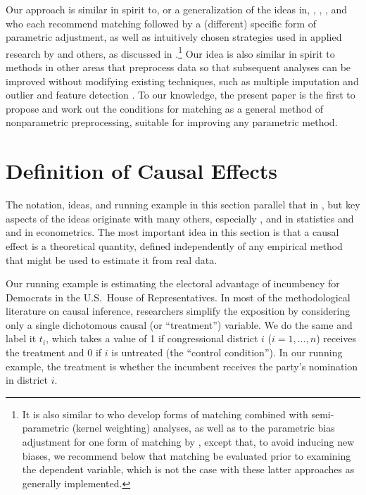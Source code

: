 \documentclass[11pt,titlepage]{article}
\begin{document}
Our approach is similar in spirit to, or a generalization of the ideas
in, \citet{ImaDyk03}, \citet{RosRub84a}, \citet{Rubin79}, and
\citet{RubTho00} who each recommend matching followed by a (different)
specific form of parametric adjustment, as well as intuitively chosen
strategies used in applied research by \citet{Rosenbaum86} and others,
as discussed in \citet{GlaLevMye03}.\footnote{It is also similar to
  \citet{HecIchTod98} who develop forms of matching combined with
  semi-parametric (kernel weighting) analyses, as well as to the
  parametric bias adjustment for one form of matching by
  \citet{AbaImb04}, except that, to avoid inducing new biases, we
  recommend below that matching be evaluated prior to examining the
  dependent variable, which is not the case with these latter
  approaches as generally implemented.}  Our idea is also similar in
spirit to methods in other areas that preprocess data so that
subsequent analyses can be improved without modifying existing
techniques, such as multiple imputation \citep{Rubin87,KinHonJos01}
and outlier and feature detection \citep[][Ch.8]{Bishop95}.  To our
knowledge, the present paper is the first to propose and work out the
conditions for matching as a general method of nonparametric
preprocessing, suitable for improving any parametric method.

\section{Definition of Causal Effects}

The notation, ideas, and running example in this section parallel that
in \citet[][Section 3.1.1]{KinKeoVer94}, but key aspects of the ideas
originate with many others, especially \citet{Neyman**},
\citet{Fisher**} \citet{Rubin74} and \citet{Holland86} in statistics
and \citet{Roy51} and \citet{Quandt**} in econometrics.  The most
important idea in this section is that a causal effect is a
theoretical quantity, defined independently of any empirical method
that might be used to estimate it from real data.

Our running example is estimating the electoral advantage of
incumbency for Democrats in the U.S.\ House of Representatives.  In
most of the methodological literature on causal inference, researchers
simplify the exposition by considering only a single dichotomous
causal (or ``treatment'') variable.  We do the same and label it
$t_i$, which takes a value of 1 if congressional district $i$
($i=1,\dots,n$) receives the treatment and 0 if $i$ is untreated (the
``control condition'').  In our running example, the treatment is
whether the incumbent receives the party's nomination in district $i$.
\end{document}
